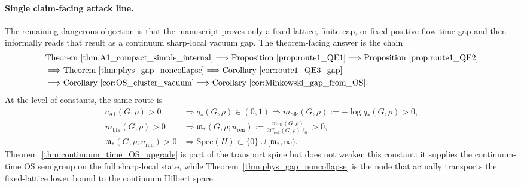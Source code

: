 \paragraph{Single claim-facing attack line.}
The remaining dangerous objection is that the manuscript proves only a fixed-lattice, finite-cap, or fixed-positive-flow-time gap and then informally reads that result as a continuum sharp-local vacuum gap.
The theorem-facing answer is the chain
\[
\begin{aligned}
&\text{Theorem~\ref{thm:A1_compact_simple_internal}}
\Longrightarrow
\text{Proposition~\ref{prop:route1_QE1}}
\Longrightarrow
\text{Proposition~\ref{prop:route1_QE2}}\\
&\Longrightarrow
\text{Theorem~\ref{thm:phys_gap_noncollapse}}
\Longrightarrow
\text{Corollary~\ref{cor:route1_QE3_gap}}\\
&\Longrightarrow
\text{Corollary~\ref{cor:OS_cluster_vacuum}}
\Longrightarrow
\text{Corollary~\ref{cor:Minkowski_gap_from_OS}}.
\end{aligned}
\]
At the level of constants, the same route is
\[
\begin{aligned}
c_{\mathrm{A1}}(G,\rho)>0
&\Longrightarrow q_\ast(G,\rho)\in(0,1)
\Longrightarrow m_{\mathrm{blk}}(G,\rho):=-\log q_\ast(G,\rho)>0,\\
m_{\mathrm{blk}}(G,\rho)>0
&\Longrightarrow \mathfrak m_\ast(G,\rho;u_{\mathrm{ren}})
:=\frac{m_{\mathrm{blk}}(G,\rho)}{2C_{\mathrm{ent}}(G,\rho)\ell_0}>0,\\
\mathfrak m_\ast(G,\rho;u_{\mathrm{ren}})>0
&\Longrightarrow \mathrm{Spec}(H)\subset\{0\}\cup[\mathfrak m_\ast,\infty).
\end{aligned}
\]
Theorem~\ref{thm:continuum_time_OS_upgrade} is part of the transport spine but does not weaken this constant: it supplies the continuum-time OS semigroup on the full sharp-local state, while Theorem~\ref{thm:phys_gap_noncollapse} is the node that actually transports the fixed-lattice lower bound to the continuum Hilbert space.

